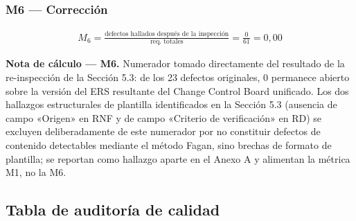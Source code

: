 \documentclass[journal,onecolumn]{IEEEtran}
\begin{document}
\subsubsection*{M6 --- Corrección}

{\setlength{\jot}{8pt}
	\begin{align*}
		M_6 = \frac{\text{defectos hallados después de la inspección}}{\text{req. totales}} = \frac{0}{61} = 0{,}00
\end{align*}}

\textbf{Nota de cálculo --- M6.} Numerador tomado directamente del resultado de la re-inspección de la Sección 5.3: de los 23 defectos originales, 0 permanece abierto sobre la versión del ERS resultante del Change Control Board unificado. Los dos hallazgos estructurales de plantilla identificados en la Sección 5.3 (ausencia de campo «Origen» en RNF y de campo «Criterio de verificación» en RD) se excluyen deliberadamente de este numerador por no constituir defectos de contenido detectables mediante el método Fagan, sino brechas de formato de plantilla; se reportan como hallazgo aparte en el Anexo A y alimentan la métrica M1, no la M6.

\subsection{Tabla de auditoría de calidad}
\end{document}
